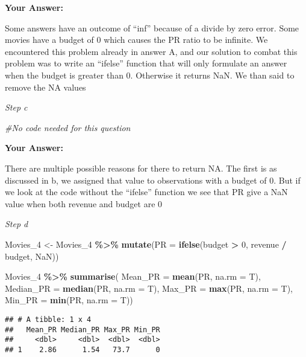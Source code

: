 \documentclass[
]{article}
\newenvironment{Shaded}{\begin{snugshade}}{\end{snugshade}}
\newcommand{\AttributeTok}[1]{\textcolor[rgb]{0.13,0.29,0.53}{#1}}
\newcommand{\CommentTok}[1]{\textcolor[rgb]{0.56,0.35,0.01}{\textit{#1}}}
\newcommand{\ConstantTok}[1]{\textcolor[rgb]{0.56,0.35,0.01}{#1}}
\newcommand{\DecValTok}[1]{\textcolor[rgb]{0.00,0.00,0.81}{#1}}
\newcommand{\FunctionTok}[1]{\textcolor[rgb]{0.13,0.29,0.53}{\textbf{#1}}}
\newcommand{\NormalTok}[1]{#1}
\newcommand{\OtherTok}[1]{\textcolor[rgb]{0.56,0.35,0.01}{#1}}
\newcommand{\SpecialCharTok}[1]{\textcolor[rgb]{0.81,0.36,0.00}{\textbf{#1}}}
\begin{document}
\textbf{Your Answer:}

Some answers have an outcome of ``inf'' because of a divide by zero
error. Some movies have a budget of 0 which causes the PR ratio to be
infinite. We encountered this problem already in answer A, and our
solution to combat this problem was to write an ``ifelse'' function that
will only formulate an answer when the budget is greater than 0.
Otherwise it returns NaN. We than said to remove the NA values

\emph{Step c}

\begin{Shaded}
\begin{Highlighting}[]
\CommentTok{\#No code needed for this question}
\end{Highlighting}
\end{Shaded}

\textbf{Your Answer:}

There are multiple possible reasons for there to return NA. The first is
as discussed in b, we assigned that value to observations with a budget
of 0. But if we look at the code without the ``ifelse'' function we see
that PR give a NaN value when both revenue and budget are 0

\emph{Step d}

\begin{Shaded}
\begin{Highlighting}[]
\NormalTok{Movies\_4 }\OtherTok{\textless{}{-}}\NormalTok{ Movies\_4 }\SpecialCharTok{\%\textgreater{}\%}
  \FunctionTok{mutate}\NormalTok{(}\AttributeTok{PR =} \FunctionTok{ifelse}\NormalTok{(budget }\SpecialCharTok{\textgreater{}} \DecValTok{0}\NormalTok{, revenue }\SpecialCharTok{/}\NormalTok{ budget, }\ConstantTok{NaN}\NormalTok{))}

\NormalTok{Movies\_4 }\SpecialCharTok{\%\textgreater{}\%}
  \FunctionTok{summarise}\NormalTok{(}
    \AttributeTok{Mean\_PR =} \FunctionTok{mean}\NormalTok{(PR, }\AttributeTok{na.rm =}\NormalTok{ T),}
    \AttributeTok{Median\_PR =} \FunctionTok{median}\NormalTok{(PR, }\AttributeTok{na.rm =}\NormalTok{ T),}
    \AttributeTok{Max\_PR =} \FunctionTok{max}\NormalTok{(PR, }\AttributeTok{na.rm =}\NormalTok{ T),}
    \AttributeTok{Min\_PR =} \FunctionTok{min}\NormalTok{(PR, }\AttributeTok{na.rm =}\NormalTok{ T))}
\end{Highlighting}
\end{Shaded}

\begin{verbatim}
## # A tibble: 1 x 4
##   Mean_PR Median_PR Max_PR Min_PR
##     <dbl>     <dbl>  <dbl>  <dbl>
## 1    2.86      1.54   73.7      0
\end{verbatim}
\end{document}
